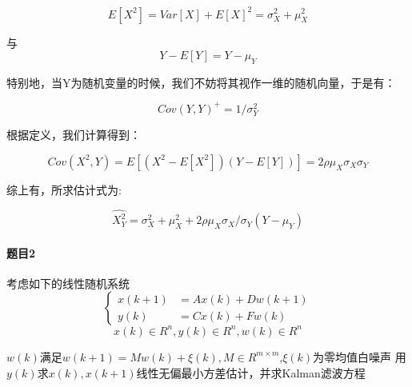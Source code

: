 \documentclass[12pt, a4paper]{ctexart}
\begin{document}
\[
    E[X^2] = Var[X] + E[X]^2 = \sigma_X^2+ \mu_X^2
\]

与
\[
    Y-E[Y]=Y-\mu_Y
\]

特别地，当Y为随机变量的时候，我们不妨将其视作一维的随机向量，于是有：

\[
    Cov(Y,Y)^+ = 1/\sigma_Y^2
\]

根据定义，我们计算得到：

\[
    Cov(X^2,Y)=E[(X^2-E[X^2])(Y-E[Y])]=2\rho\mu_X\sigma_X\sigma_Y
\]

综上有，所求估计式为:

\[
    \hat{X^2_Y} = \sigma_X^2 +\mu_X^2 +2\rho\mu_X\sigma_X/\sigma_Y(Y-\mu_Y)
\]

\paragraph{题目2}
考虑如下的线性随机系统
	\[
	\left\{\begin{array}{rl}
		x(k+1)&=Ax(k)+Dw(k+1)\\
		y(k)&=Cx(k)+Fw(k)
		\end{array}\right.
	\]
	\[
		x(k)\in R^n,y(k)\in R^n,w(k)\in R^n
	\]

	$w(k)$满足$w(k+1)=Mw(k)+\xi(k),M\in R^{m\times m}$,$\xi(k)$为零均值白噪声
    用$y(k)$求$x(k),x(k+1)$线性无偏最小方差估计，并求Kalman滤波方程
    
\end{document}

